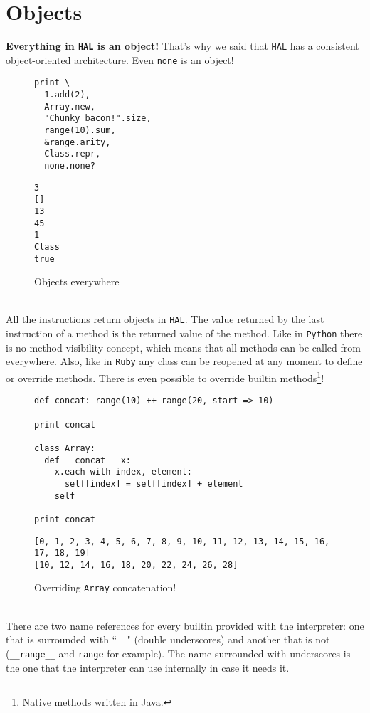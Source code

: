 \documentclass[a4paper,11pt]{article}
\begin{document}
\section{Objects}
\textbf{Everything in \texttt{HAL} is an object!} That's why we said that \texttt{HAL} has a consistent
  object-oriented architecture. Even \texttt{none} is an object!
\begin{figure}[h!]
\begin{lstlisting}[language=hal]
print \
  1.add(2),
  Array.new,
  "Chunky bacon!".size,
  range(10).sum,
  &range.arity,
  Class.repr,
  none.none?
\end{lstlisting}
\begin{lstlisting}[language=output]
3
[]
13
45
1
Class
true
\end{lstlisting}
\caption{Objects everywhere}
\label{objects}
\end{figure}
\\
All the instructions return objects in \texttt{HAL}. The value returned by the last instruction of a method
  is the returned value of the method.
\clearpage
Like in \texttt{Python} there is no method visibility
  concept, which means that all methods can be called from everywhere. Also, like in \texttt{Ruby}
  any class can be reopened at any moment to define or override methods. There is even possible to
  override builtin methods\footnote{Native methods written in Java.}!
\begin{figure}[h!]
\begin{lstlisting}[language=hal]
def concat: range(10) ++ range(20, start => 10)

print concat

class Array:
  def __concat__ x:
    x.each with index, element:
      self[index] = self[index] + element
    self

print concat
\end{lstlisting}
\begin{lstlisting}[language=output]
[0, 1, 2, 3, 4, 5, 6, 7, 8, 9, 10, 11, 12, 13, 14, 15, 16, 17, 18, 19]
[10, 12, 14, 16, 18, 20, 22, 24, 26, 28]
\end{lstlisting}
\caption{Overriding \texttt{Array} concatenation!}
\label{overrides}
\end{figure}
\\
There are two name references for every builtin provided with the interpreter: one that is
  surrounded with ``\texttt{\_\_}" (double underscores) and another that is not (\texttt{\_\_range\_\_} and \texttt{range} for example).
  The name surrounded with underscores is the one that the interpreter can use internally in case it needs it.
\end{document}
